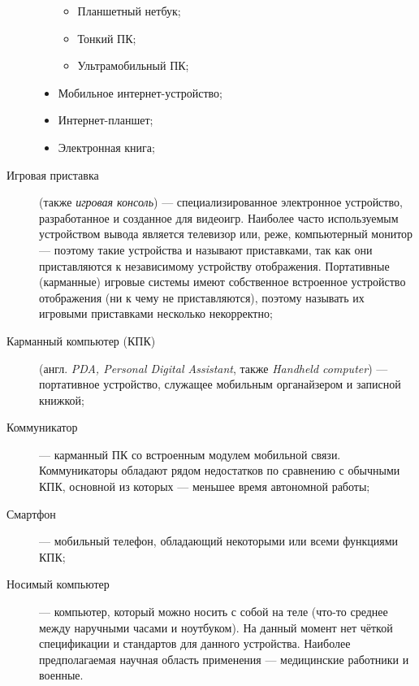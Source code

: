 \begin{description}
\begin{itemize}
         \begin{itemize}
          \item Планшетный нетбук;
          \item Тонкий ПК;
          \item Ультрамобильный ПК;
         \end{itemize}
   \item Мобильное интернет-устройство;
   \item Интернет-планшет;
   \item Электронная книга;
  \end{itemize}
 \item[Игровая приставка] (также \emph{игровая консоль}) --- специализированное электронное устройство, разработанное и созданное для видеоигр. Наиболее часто используемым устройством вывода является телевизор или, реже, компьютерный монитор --- поэтому такие устройства и называют приставками, так как они приставляются к независимому устройству отображения.
 Портативные (карманные) игровые системы имеют собственное встроенное устройство отображения (ни к чему не приставляются), поэтому называть их игровыми приставками несколько некорректно;
 \item[Карманный компьютер (КПК)] (англ. \emph{PDA, Personal Digital Assis\-tant}, также \emph{Handheld computer}) --- портативное устройство, служащее мобильным органайзером и записной книжкой;
 \item[Коммуникатор] --- карманный ПК со встроенным модулем мобильной связи. Коммуникаторы обладают рядом недостатков по сравнению с обычными КПК, основной из которых --- меньшее время автономной работы;
 \item[Смартфон] --- мобильный телефон, обладающий некоторыми или всеми функциями КПК;
 \item[Носимый компьютер] --- компьютер, который можно носить с собой на теле (что-то среднее между наручными часами и ноутбуком). На данный момент нет чёткой спецификации и стандартов для данного устройства. Наиболее предполагаемая научная область применения --- медицинские работники и военные.
\end{description}
